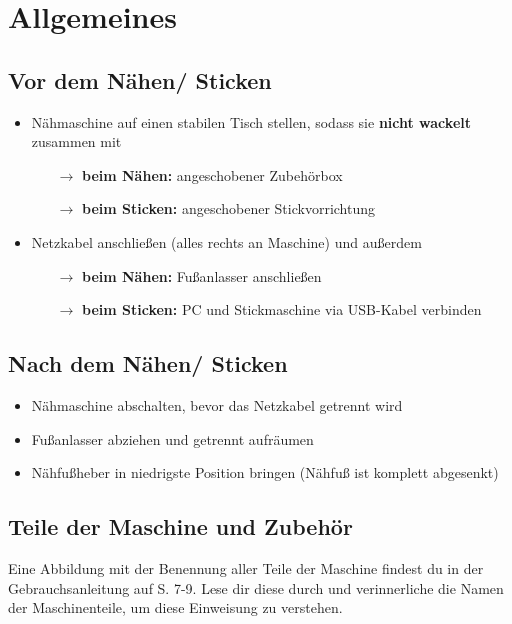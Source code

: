\documentclass{\basedir/fablab-document}
\begin{document}
\pagebreak
\section{Allgemeines}

\subsection{Vor dem Nähen/ Sticken}
\begin{itemize}
 \item Nähmaschine auf einen stabilen Tisch stellen, sodass sie \textbf{nicht wackelt} zusammen mit
 \begin{itemize}
 	\item[$\rightarrow$] \textbf{beim Nähen:} angeschobener Zubehörbox
 	\item[$\rightarrow$] \textbf{beim Sticken:} angeschobener Stickvorrichtung
 \end{itemize}
 \item Netzkabel anschließen (alles rechts an Maschine) und außerdem
  \begin{itemize}
 	\item[$\rightarrow$] \textbf{beim Nähen:} Fußanlasser anschließen
 	\item[$\rightarrow$] \textbf{beim Sticken:} PC und Stickmaschine via USB-Kabel verbinden
 \end{itemize}
\end{itemize}

\subsection{Nach dem Nähen/ Sticken}
\begin{itemize}
 \item Nähmaschine abschalten, bevor das Netzkabel getrennt wird
 \item Fußanlasser abziehen und getrennt aufräumen
 \item Nähfußheber in niedrigste Position bringen (Nähfuß ist komplett abgesenkt)
\end{itemize}

\subsection{Teile der Maschine und Zubehör}

Eine Abbildung mit der Benennung aller Teile der Maschine findest du in der Gebrauchsanleitung auf S. 7-9. Lese dir diese durch und verinnerliche die Namen der Maschinenteile, um diese Einweisung zu verstehen.
\end{document}
